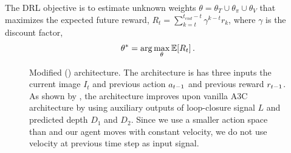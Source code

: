 The DRL objective is to estimate unknown weights $\theta = \theta_T \cup \theta_\pi \cup \theta_V$ that maximizes the expected future reward, $R_t = \sum_{k=t}^{t_{end} - t} \gamma^{k-t} r_k$, where $\gamma$ is the discount factor,
%
\begin{align}
\theta^* = \arg\max_{\theta} \mathbb{E}[R_t] \,.
\end{align}
%
\begin{figure}%
\begin{center}
\scalebox{1.3}{}%
\end{center}
\caption{Modified \NavAiiiCDiDiiL{} (\cite{MiPaViICLR2017}) architecture.
The architecture is has three inputs the current image $I_t$ and previous action $a_{t-1}$ and previous reward $r_{t-1}$.
As shown by \cite{MiPaViICLR2017}, the architecture improves upon vanilla A3C architecture by using auxiliary outputs of loop-closure signal $L$ and predicted depth $D_1$ and $D_2$.
Since we use a smaller action space than \cite{MiPaViICLR2017} and our agent moves with constant velocity, we do not use velocity at previous time step as input signal.}
\label{fig:architectures}
\end{figure}

